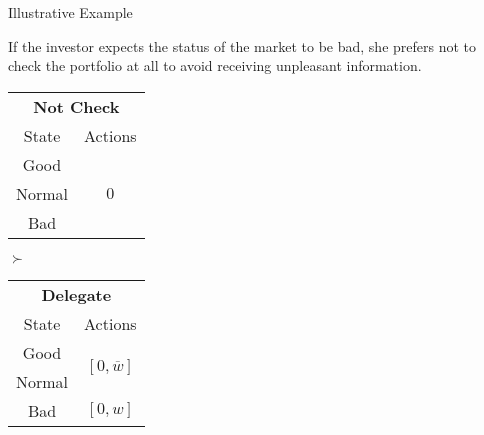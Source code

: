 \documentclass[usenames,dvipsnames,aspectratio=169,11pt, envcountsect]{beamer}
\begin{document}
\begin{frame}[noframenumbering]{Illustrative Example}

	If the investor expects the status of the market to be bad, she prefers not to check the portfolio at all to avoid receiving unpleasant information.

	\vfill

	\begin{table}[H]
		\centering
		\begin{minipage}{0.29\textwidth}
			\centering
			\begin{tabular}{c | c}
				\multicolumn{2}{c}{\textbf{Not Check}} \\
				State  & Actions                       \\
				\hline
				Good   & \multirow{3}{*}{ \( 0 \)}     \\
				Normal &                               \\
				Bad    &                               \\
			\end{tabular}
			\vspace{0.5cm} %
		\end{minipage}\hspace{0.3cm} %
		\( \succ \) %
		\begin{minipage}{0.29\textwidth}
			\centering
			\begin{tabular}{c | c}
				\multicolumn{2}{c}{\textbf{Delegate}}                                                                     \\
				State                        & Actions                                                                    \\
				\hline
				{\color{bleudefrance}Good}   & \multirow{2}{*}{{\color{bleudefrance}\( \left[0, \overline{w} \right] \)}} \\
				{\color{bleudefrance}Normal} &                                                                            \\
				Bad                          & \( \left[0, w \right]\)                                                    \\
			\end{tabular}
			\vspace{0.5cm} %
		\end{minipage}\hspace{0.3cm} %

\end{table}
\end{frame}
\end{document}
